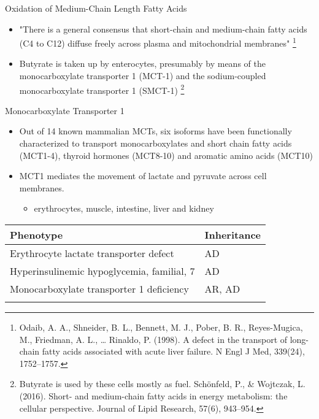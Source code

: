 \documentclass[presentation, smaller]{beamer}
\begin{document}
\begin{frame}[label={sec:orgheadline5}]{Oxidation of Medium-Chain Length Fatty Acids}
\begin{itemize}
\item "There is a general consensus that short-chain and medium-chain fatty
acids (C4 to C12) diffuse freely across plasma and mitochondrial
membranes" \footnote{Odaib, A. A., Shneider, B. L., Bennett, M. J., Pober, B. R.,
Reyes-Mugica, M., Friedman, A. L., … Rinaldo, P. (1998). A defect in
the transport of long-chain fatty acids associated with acute liver
failure. N Engl J Med, 339(24), 1752–1757.}

\item Butyrate is taken up by enterocytes, presumably by means of the
monocarboxylate transporter 1 (MCT-1) and the sodium-coupled
monocarboxylate transporter 1 (SMCT-1) \footnote{Butyrate is used by these cells mostly as fuel.  Schönfeld, P., \&
Wojtczak, L. (2016). Short- and medium-chain fatty acids in energy
metabolism: the cellular perspective. Journal of Lipid Research,
57(6), 943–954.}
\end{itemize}
\end{frame}


\begin{frame}[label={sec:orgheadline6}]{Monocarboxylate Transporter 1}
\begin{itemize}
\item Out of 14 known mammalian MCTs, six isoforms have been functionally
characterized to transport monocarboxylates and short chain fatty
acids (MCT1-4), thyroid hormones (MCT8-10) and aromatic amino
acids (MCT10)

\item MCT1 mediates the movement of lactate and pyruvate across cell
membranes.
\begin{itemize}
\item erythrocytes, muscle, intestine, liver and kidney
\end{itemize}
\end{itemize}

\begin{center}
\begin{tabular}{ll}
Phenotype & Inheritance\\
\hline
Erythrocyte lactate transporter defect & AD\\
Hyperinsulinemic hypoglycemia, familial, 7\footnotemark & AD\\
Monocarboxylate transporter 1 deficiency & AR, AD\\
 & \\
\end{tabular}
\end{center}
\end{frame}
\end{document}
